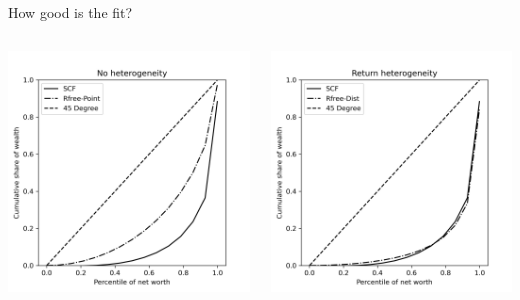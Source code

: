 \documentclass{beamer}
\begin{document}
\begin{frame}{How good is the fit?}

   \begin{columns}
    \centering
    \includegraphics[width=\textwidth]{Figures/PYrrPointNetWorthPlot.png}

    \centering
    \includegraphics[width=\textwidth]{Figures/PYrrDistNetWorthPlot.png}

  \end{columns}

\end{frame}
\end{document}
